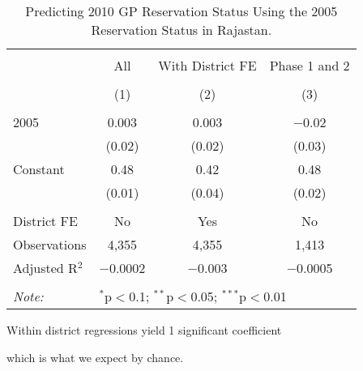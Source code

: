 \begin{table}[!htbp]
\centering
\begin{threeparttable}

  \caption{Predicting 2010 GP Reservation Status Using the 2005 Reservation Status in Rajastan.} 
  \label{rand_or_no_raj} 
\scriptsize 
\begin{tabular}{@{\extracolsep{0pt}}lccc} 
\\[-1.8ex]\hline 
\hline \\[-1.8ex] 
 & All & With District FE & Phase 1 and 2 \\ 
\\[-1.8ex] & (1) & (2) & (3)\\ 
\hline \\[-1.8ex] 
 2005 & 0.003 & 0.003 & $-$0.02 \\ 
  & (0.02) & (0.02) & (0.03) \\ 
  Constant & 0.48 & 0.42 & 0.48 \\ 
  & (0.01) & (0.04) & (0.02) \\ 
 \hline \\[-1.8ex] 
District FE & No & Yes & No \\ 
Observations & 4,355 & 4,355 & 1,413 \\ 
Adjusted R$^{2}$ & $-$0.0002 & $-$0.003 & $-$0.0005 \\ 
\hline 
\hline \\[-1.8ex] 
\textit{Note:}  & \multicolumn{3}{l}{$^{*}$p$<$0.1; $^{**}$p$<$0.05; $^{***}$p$<$0.01} \\ 
\end{tabular} 
\begin{tablenotes}[flushleft]
\scriptsize
\item Within district regressions yield 1 significant coefficient
\item which is what we expect by chance.
\end{tablenotes}
\end{threeparttable}
\end{table}
